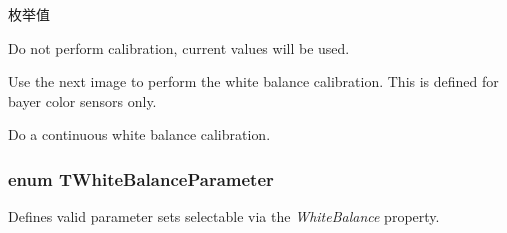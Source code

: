 \begin{Desc}
\item[枚举值]\par
\begin{description}
\item[{\em 
\hypertarget{group___common_interface_gga7218069510c56114414c935faf5bfd09a0ae5cb16c006996f1fef43e5a322a8d4}{wbcm\+Off}\label{group___common_interface_gga7218069510c56114414c935faf5bfd09a0ae5cb16c006996f1fef43e5a322a8d4}
}]Do not perform calibration, current values will be used. \item[{\em 
\hypertarget{group___common_interface_gga7218069510c56114414c935faf5bfd09a660fe7cad145e6f794a0b85bb9d8f6a2}{wbcm\+Next\+Frame}\label{group___common_interface_gga7218069510c56114414c935faf5bfd09a660fe7cad145e6f794a0b85bb9d8f6a2}
}]Use the next image to perform the white balance calibration. This is defined for bayer color sensors only. \item[{\em 
\hypertarget{group___common_interface_gga7218069510c56114414c935faf5bfd09a207795ab12678fd3dba0eda8b87a85bd}{wbcm\+Continuous}\label{group___common_interface_gga7218069510c56114414c935faf5bfd09a207795ab12678fd3dba0eda8b87a85bd}
}]Do a continuous white balance calibration. \end{description}
\end{Desc}
\hypertarget{group___common_interface_ga7559c75a4eb1303c10ba8b611022d4c7}{
\subsubsection[{T\+White\+Balance\+Parameter}]{\setlength{\rightskip}{0pt plus 5cm}enum {\bf T\+White\+Balance\+Parameter}}}\label{group___common_interface_ga7559c75a4eb1303c10ba8b611022d4c7}


Defines valid parameter sets selectable via the {\itshape White\+Balance} property. 

